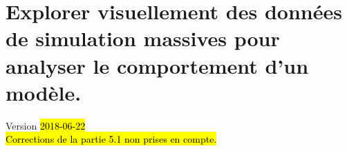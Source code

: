 \chapter{Explorer visuellement des données de simulation massives pour analyser le comportement d'un modèle.} 
\begin{center}
	{\large Version \hl{2018-06-22}}\\
	\hl{Corrections de la partie 5.1 non prises en compte.}
	
\end{center}
\minitoc

\clearpage

%
%
%
%
%
%
